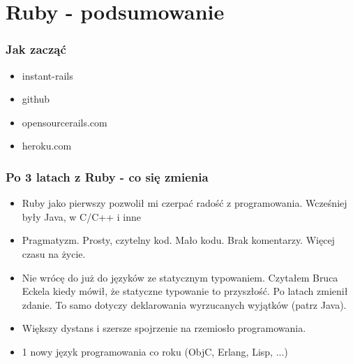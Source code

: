 \documentclass[12t]{beamer}
\begin{document}
\section{Ruby - podsumowanie}
\begin{frame}
  \frametitle{Jak zacząć}
  \begin{itemize}
  \item instant-rails
  \item github
  \item opensourcerails.com
  \item heroku.com
  \end{itemize}
\end{frame}

\begin{frame}
  \frametitle{Po 3 latach z Ruby - co się zmienia}
  \begin{itemize}
  \item Ruby jako pierwszy pozwolił mi czerpać radość z
    programowania. Wcześniej były Java, w C/C++ i inne
  \item Pragmatyzm. Prosty, czytelny kod. Mało kodu. Brak
    komentarzy. Więcej czasu na życie.
  \item Nie wrócę do już do języków ze statycznym typowaniem. Czytałem
    Bruca Eckela kiedy mówił, że statyczne typowanie to przyszłość. Po
    latach zmienił zdanie. To samo dotyczy deklarowania wyrzucanych
    wyjątków (patrz Java).
  \item Większy dystans i szersze spojrzenie na rzemiosło programowania.
  \item 1 nowy język programowania co roku (ObjC, Erlang, Lisp, ...)
  \end{itemize}
\end{frame}
\end{document}

